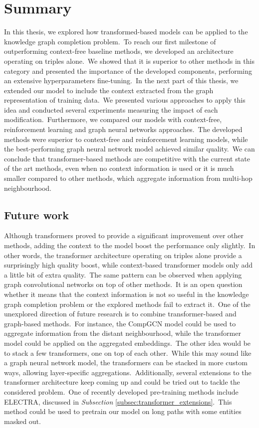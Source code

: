 \documentclass[longabstract, english, mgr]{iithesis}
\newcommand\numberedchapter[1]{\setlength\topskip{3cm}\chapter{#1}\setlength\topskip{0cm}}
\theoremstyle{default_theorem_style}\newtheorem{theorem}{Theorem}
\theoremstyle{default_theorem_style}\newtheorem{definition}{Definition}
\begin{document}
\numberedchapter{Summary}

In this thesis, we explored how transformed-based models can be applied to the knowledge graph completion
problem.\ To reach our first milestone of outperforming context-free baseline methods, we developed an architecture
operating on triples alone.\ We showed that it is superior to other methods in this category and presented the
importance of the developed components, performing an extensive hyperparameters fine-tuning.\ In the next part of this
thesis, we extended our model to include the context extracted from the graph representation of training data.\ We
presented various approaches to apply this idea and conducted several experiments measuring the impact of each
modification.\ Furthermore, we compared our models with context-free, reinforcement learning and graph neural networks
approaches.\ The developed methods were superior to context-free and reinforcement learning models, while the
best-performing graph neural network model achieved similar quality.\ We can conclude that transformer-based methods
are competitive with the current state of the art methods, even when no context information is used or it is much
smaller compared to other methods, which aggregate information from multi-hop neighbourhood.

\section{Future work}

Although transformers proved to provide a significant improvement over other methods, adding the context to the model
boost the performance only slightly.\ In other words, the transformer architecture operating on triples alone provide
a surprisingly high quality boost, while context-based transformer models only add a little bit of extra quality.\ The
same pattern can be observed when applying graph convolutional networks on top of other methods.\ It is an open
question whether it means that the context information is not so useful in the knowledge graph completion problem
or the explored methods fail to extract it.\ One of the unexplored direction of future research is to combine
transformer-based and graph-based methods.\ For instance, the CompGCN model could be used to aggregate information from
the distant neighbourhood, while the transformer model could be applied on the aggregated embeddings.\ The other idea
would be to stack a few transformers, one on top of each other.\ While this may sound like a graph neural network model,
the transformers can be stacked in more custom ways, allowing layer-specific aggregations.\ Additionally, several
extensions to the transformer architecture keep coming up and could be tried out to tackle the considered
problem.\ One of recently developed pre-training methods include ELECTRA, discussed in
\textit{Subsection} \ref{subsec:transformer_extensions}.\ This method could be used to pretrain our model on long paths
with some entities masked out.
\end{document}

